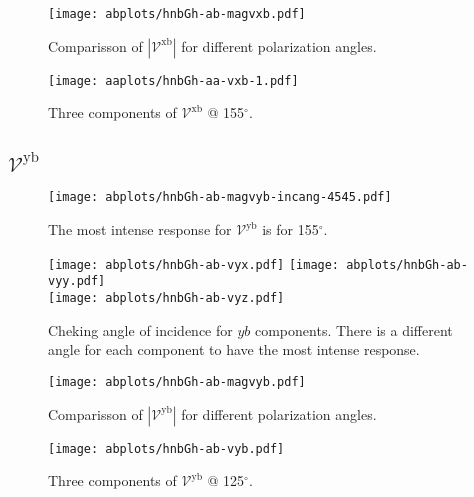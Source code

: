 \documentclass{article}
\let\Oldsubsection\subsection
\renewcommand{\subsection}{\FloatBarrier\Oldsubsection}
\begin{document}
\begin{figure}[ht!]
    \centering
    \texttt{[image: abplots/hnbGh-ab-magvxb.pdf]}
    \caption{Comparisson of $|\mathcal{V}^{\mathrm{xb}}|$ for different
    polarization angles.}
    \label{fig:ab-magvxb}
\end{figure}
\begin{figure}[ht!]
    \centering
    \texttt{[image: aaplots/hnbGh-aa-vxb-1.pdf]}
    \caption{Three components of $\mathcal{V}^{\mathrm{xb}} $ @ 155$^{\circ}$.}
    \label{fig:ab-vxb}
\end{figure}

\clearpage

\subsection{$\mathcal{V}^{\mathrm{yb}} $}
\begin{figure}[h!]
    \centering
    \texttt{[image: abplots/hnbGh-ab-magvyb-incang-4545.pdf]}
    \caption{The most intense response for $\mathcal{V}^{\mathrm{yb}} $ is for 
    155$^{\circ}$.}
    \label{fig:ab-magvybincang}
\end{figure}
\begin{figure}[h!]
    \centering
    \texttt{[image: abplots/hnbGh-ab-vyx.pdf]}
    \texttt{[image: abplots/hnbGh-ab-vyy.pdf]}\\
    \texttt{[image: abplots/hnbGh-ab-vyz.pdf]}
    \caption{Cheking angle of incidence for $yb$ components. There is a
    different angle for each component to have the most intense response.}
    \label{fig:ab-ybangcomp}
\end{figure}

\begin{figure}[ht!]
    \centering
    \texttt{[image: abplots/hnbGh-ab-magvyb.pdf]}
    \caption{Comparisson of $|\mathcal{V}^{\mathrm{yb}}|$ for different
    polarization angles.}
    \label{fig:ab-magvyb}
\end{figure}
\begin{figure}[ht!]
    \centering
    \texttt{[image: abplots/hnbGh-ab-vyb.pdf]}
    \caption{Three components of $\mathcal{V}^{\mathrm{yb}} $ @ 125$^{\circ}$.}
    \label{fig:ab-vyb}
\end{figure}
\end{document}
